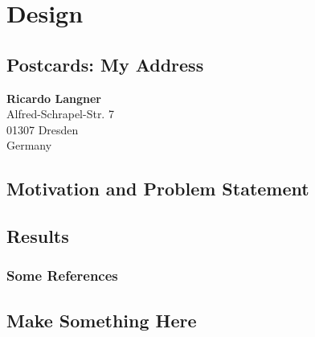 %
\chapter{Design}
\label{sec:design}


\Blindtext[2][2]

\section{Postcards: My Address}
\label{sec:design:address}

\textbf{Ricardo Langner} \\
Alfred-Schrapel-Str. 7 \\
01307 Dresden \\
Germany


\section{Motivation and Problem Statement}
\label{sec:design:motivation}

\Blindtext[3][1] \cite{Jurgens:2000,Jurgens:1995,Miede:2011,Kohm:2011,Apple:keynote:2010,Apple:numbers:2010,Apple:pages:2010}

\section{Results}
\label{sec:design:results}

\Blindtext[1][2]

\subsection{Some References}
\label{sec:design:results:refs}
\cite{WEB:GNU:GPL:2010,WEB:Miede:2011}

\section{Make Something Here}
\label{sec:design:CHANGEME}
